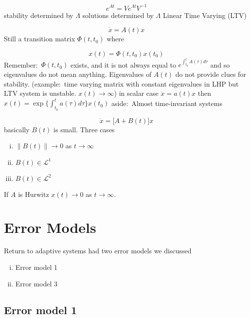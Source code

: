 \begin{equation*}
  e^{At}=Ve^{\Lambda t}V^{-1}
\end{equation*}
stability determined by $\Lambda$
solutions determined by $\Lambda$
Linear Time Varying (LTV)

\begin{equation*}
  \dot{x}=A(t)x
\end{equation*}
Still a transition matrix $\Phi(t,t_{0})$ where

\begin{equation*}
  x(t)=\Phi(t,t_{0})x(t_{0})
\end{equation*}
Remember:\ $\Phi(t,t_{0})$ exists, and it is not always equal to $e^{\int_{t_{0}}^{t}A(\tau)d\tau}$ and so eigenvalues do not mean anything.
Eigenvalues of $A(t)$ do not provide clues for stability.
(example:\ time varying matrix with constant eigenvalues in LHP but LTV system is unstable.
$x(t)\rightarrow\infty$)
in scalar case $\dot{x}=a(t)x$ then $x(t)=\exp\{\int_{t_{0}}^{t}a(\tau)d\tau\}x(t_{0})$
aside:\ Almost time-invariant systems

\begin{equation*}
  \dot{x}=\bigr[A+B(t)\bigr]x
\end{equation*}
basically $B(t)$ is small.
Three cases

\begin{enumerate}[(i)]
  \item{$\|B(t)\|\rightarrow0$ as $t\rightarrow\infty$}
  \item{$B(t)\in\mathcal{L}^{1}$}
  \item{$B(t)\in\mathcal{L}^{2}$}
\end{enumerate}

If $A$ is Hurwitz $x(t)\rightarrow0$ as $t\rightarrow\infty$.

\section{Error Models}

Return to adaptive systems
had two error models we discussed

\begin{enumerate}[(i)]
  \item{Error model 1}
  \item{Error model 3}
\end{enumerate}

\subsection{Error model 1}

